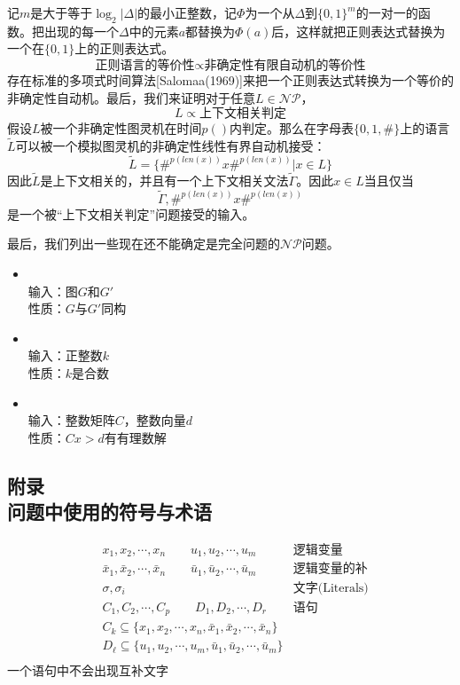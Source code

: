 \documentclass[twocolumn]{article}
\theoremstyle{nonumberplain}%
\begin{document}
\begin{CJK}{UTF8}{gbsn}
    记$m$是大于等于$\log_2{|\Delta|}$的最小正整数，记$\Phi$为一个从$\Delta$到$\{0,1\}^m$的一对一的函数。把出现的每一个$\Delta$中的元素$a$都替换为$\Phi(a)$后，这样就把正则表达式替换为一个在$\{0,1\}$上的正则表达式。
    $$\text{正则语言的等价性}\propto\text{非确定性有限自动机的等价性}$$
    存在标准的多项式时间算法[Salomaa(1969)]来把一个正则表达式转换为一个等价的非确定性自动机。最后，我们来证明对于任意$L\in\mathcal{NP}$，$$L\propto\text{上下文相关判定}$$
    假设$L$被一个非确定性图灵机在时间$p()$内判定。那么在字母表$\{0,1,\#\}$上的语言$\widetilde{L}$可以被一个模拟图灵机的非确定性线性有界自动机接受：
    $$\widetilde{L}=\{\#^{p(len(x))}x\#^{p(len(x))}|x\in L\}$$
    因此$\widetilde{L}$是上下文相关的，并且有一个上下文相关文法$\widetilde{\Gamma}$。因此$x\in L$当且仅当
    $$\widetilde{\Gamma},\#^{p(len(x))}x\#^{p(len(x))}$$
    是一个被“上下文相关判定”问题接受的输入。

    最后，我们列出一些现在还不能确定是完全问题的$\mathcal{NP}$问题。
    \begin{itemize}
      \item {}\\
      输入：图$G$和$G'$\\
      性质：$G$与$G'$同构

      \item {}\\
          输入：正整数$k$\\
          性质：$k$是合数

      \item {}\\
      输入：整数矩阵$C$，整数向量$d$\\
      性质：$Cx>d$有有理数解
    \end{itemize}

    \begin{appendices}
      \section{附录\\
      问题中使用的符号与术语}
      \begin{equation}\nonumber
      \begin{aligned}
        &x_1,x_2,\cdots,x_n \qquad u_1,u_2,\cdots,u_m & \text{逻辑变量}\\
        &\bar{x}_1,\bar{x}_2,\cdots,\bar{x}_n \qquad \bar{u}_1,\bar{u}_2,\cdots,\bar{u}_m & \text{逻辑变量的补}\\
        &\sigma,\sigma_i & \text{文字(Literals)}\\
        &C_1,C_2,\cdots,C_p \qquad D_1,D_2,\cdots,D_r & \text{语句}\\
        &C_k\subseteq \{x_1,x_2,\cdots,x_n,\bar{x}_1,\bar{x}_2,\cdots,\bar{x}_n\}\\
        &D_\ell\subseteq \{u_1,u_2,\cdots,u_m,\bar{u}_1,\bar{u}_2,\cdots,\bar{u}_m\}\\
      \end{aligned}
      \end{equation}
      一个语句中不会出现互补文字\\
      

\end{appendices}
\end{CJK}
\end{document}
